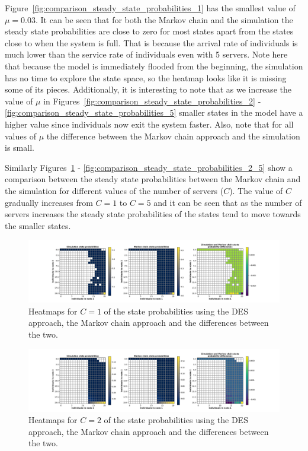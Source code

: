 Figure~\ref{fig:comparison_steady_state_probabilities_1} has the smallest
value of \(\mu = 0.03\).
It can be seen that for both the Markov chain and the simulation the steady
state probabilities are close to zero for most states apart from the
states close to when the system is full.
That is because the arrival rate of individuals is much lower than the service
rate of individuals even with 5 servers.
Note here that because the model is immediately flooded from the beginning, the
simulation has no time to explore the state space, so the heatmap looks like
it is missing some of its pieces.
Additionally, it is interesting to note that as we increase the value of \(\mu\)
in Figures~\ref{fig:comparison_steady_state_probabilities_2} -
\ref{fig:comparison_steady_state_probabilities_5} smaller states in the model
have a higher value since individuals now exit the system faster.
Also, note that for all values of \(\mu\) the difference between the Markov
chain approach and the simulation is small.

Similarly Figures~\ref{fig:comparison_steady_state_probabilities_2_1} -
\ref{fig:comparison_steady_state_probabilities_2_5} show a comparison between
the steady state probabilities between the Markov chain and the simulation
for different values of the number of servers (\(C\)).
The value of \(C\) gradually increases from \(C = 1\) to \(C = 5\) and it can
be seen that as the number of servers increases the steady state probabilities
of the states tend to move towards the smaller states.


\begin{figure}[H]
    \includegraphics[width=\textwidth, trim=100 10 100 10, clip]{chapters/03_queueing_model/Bin/numeric_results_and_timings/steady_state_probabilities_2/main_1.pdf}
    \caption{Heatmaps for \(C = 1\) of the state probabilities using the
    DES approach, the Markov chain approach and the differences between the
    two.}
    \label{fig:comparison_steady_state_probabilities_2_1}
\end{figure}

\begin{figure}[H]
    \includegraphics[width=\textwidth, trim=100 10 100 10, clip]{chapters/03_queueing_model/Bin/numeric_results_and_timings/steady_state_probabilities_2/main_2.pdf}
    \caption{Heatmaps for \(C = 2\) of the state probabilities using the
    DES approach, the Markov chain approach and the differences between the
    two.}
    \label{fig:comparison_steady_state_probabilities_2_2}
\end{figure}

